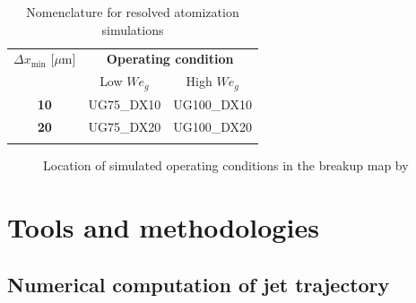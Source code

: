 \clearpage


\begin{table}[!h]
\centering
\caption{Nomenclature for resolved atomization simulations}
\begin{tabular}{ccc}
\thickhline
$\Delta x_\mathrm{min}$ [$\mu$m]  &  \multicolumn{2}{c}{\textbf{Operating condition}} \\ 
\cline{2-3}
 &  Low $We_g$ &  High $We_g$ \\ 
\thickhline
\textbf{10} & UG75\_DX10 & UG100\_DX10 \\
\textbf{20} & UG75\_DX20 & UG100\_DX20 \\
\thickhline
\end{tabular}
\label{tab:jicf_resolved_simulations_performed}
\end{table}

\begin{figure}[ht]
     \centering
     \caption{Location of simulated operating conditions in the breakup map by \citeColor[wu_breakup_1997]}
      \label{fig:location_JICF_ops_in_breakup_map}
\end{figure}




\section{Tools and methodologies}


\subsection{Numerical computation of jet trajectory}
	\label{sec:ch5_tools_jicf_trajectories}

